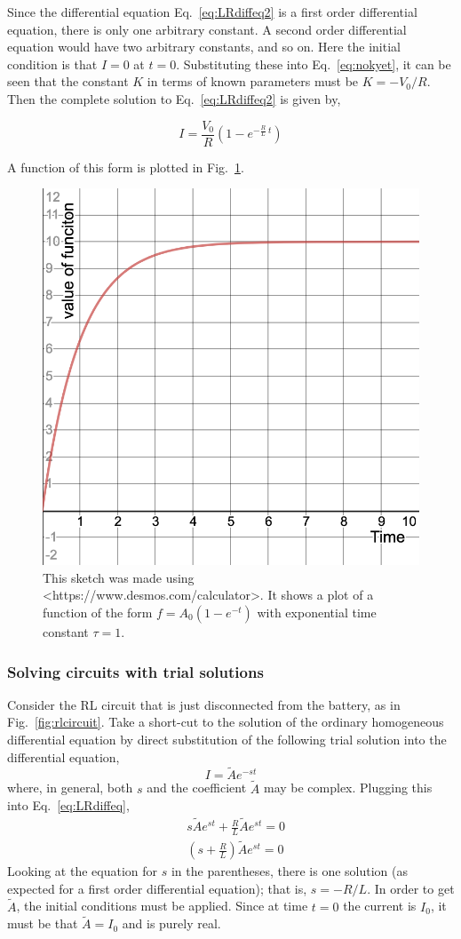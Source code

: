 \documentclass[12pt]{article}
\begin{document}
\begin{flushleft}
Since the differential equation Eq.~\ref{eq:LRdiffeq2} is a first order differential equation, there is only one arbitrary constant.  A second order differential equation would have two arbitrary constants, and so on.  Here the initial condition is that $I=0$ at $t=0$.  Substituting these into Eq.~\ref{eq:nokyet}, it can be seen that the constant $K$ in terms of known parameters must be $K=-V_{0}/R$.  Then the complete solution to Eq.~\ref{eq:LRdiffeq2} is given by,

\begin{equation*} 
I = \frac{V_{0}}{R} \left(  1- e^{ -\frac{R}{L}\:t  } \right)
\end{equation*}

A function of this form is plotted in Fig.~\ref{fig:expgrowth}.

\vspace{.1in}
\begin{figure}[h]
\centering
\includegraphics*[trim=0cm 0cm 0cm 0cm, clip=true, width=0.4\columnwidth]{expgrowth.png}
\caption{\small This sketch was made using \textless https://www.desmos.com/calculator\textgreater.  It shows a plot of a function of the form $f=A_{0}\left(1-e^{-t}\right)$ with exponential time constant $\tau=1$.}
\label{fig:expgrowth}
\end{figure}

\newpage
\subsubsection*{Solving circuits with trial solutions}

Consider the RL circuit that is just disconnected from the battery, as in Fig.~\ref{fig:rlcircuit}.  Take a short-cut to the solution of the ordinary homogeneous differential equation by direct substitution of the following trial solution into the differential equation,
\begin{equation}
 I = \tilde{A} e^{-st} 
\label{eq:trailsol}
\end{equation}
where, in general, both $s$ and the coefficient $\tilde{A}$ may be complex.  Plugging this into Eq.~\ref{eq:LRdiffeq},
\begin{eqnarray*}
& s\tilde{A}e^{st}+\frac{R}{L}\tilde{A}e^{st}=0 \\
& \left( s+\frac{R}{L} \right) \tilde{A}e^{st}=0
\end{eqnarray*}
Looking at the equation for $s$ in the parentheses, there is one solution (as expected for a first order differential equation); that is, $s=-R/L$.  In order to get $\tilde{A}$, the initial conditions must be applied.  Since at time $t=0$ the current is $I_{0}$, it must be that $\tilde{A}=I_{0}$ and is purely real.


\end{flushleft}
\end{document}
